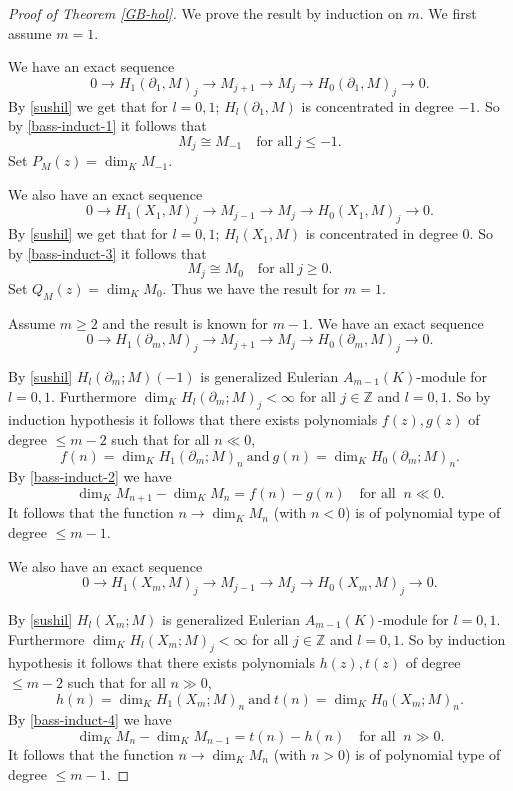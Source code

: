 \documentclass{amsart}
\newcommand{\ZZ}{\mathbb{Z} }
\newcommand{\rt}{\rightarrow}
\theoremstyle{plain}
\theoremstyle{definition}
\theoremstyle{remark}
\begin{document}
\begin{proof}[Proof of Theorem \ref{GB-hol}]
We prove the result by induction on $m$. We first assume $m = 1$.


We have an exact sequence
 \begin{equation}
  \label{bass-induct-1}
  0 \rt H_1(\partial_1, M)_j \rt M_{j+1} \rt M_j \rt H_0(\partial_1, M)_j \rt 0.
 \end{equation}
By \ref{sushil} we get that  for $l = 0,1$; $H_l(\partial_1, M)$ is concentrated in degree $-1$.
So by \ref{bass-induct-1} it follows that 
\[
 M_j \cong M_{-1} \quad \text{for all} \ j \leq -1.
\]
Set $P_M(z) = \dim_K M_{-1}$.

 We  also have an exact sequence
 \begin{equation}
  \label{bass-induct-3}
  0 \rt H_1(X_1, M)_j \rt M_{j-1} \rt M_j \rt H_0(X_1, M)_j \rt 0.
 \end{equation}
By \ref{sushil} we get that for $l = 0, 1$; $H_l(X_1, M)$ is concentrated in degree $0$.
So by \ref{bass-induct-3} it follows that 
\[
 M_j \cong M_{0} \quad \text{for all} \ j \geq 0.
\]
Set $Q_M(z) = \dim_K M_{0}$.
Thus we have the result for $m = 1$.

Assume $m \geq 2$ and the result is known for $m -1$.
We have an exact sequence
 \begin{equation}
  \label{bass-induct-2}
  0 \rt H_1(\partial_m, M)_j \rt M_{j+1} \rt M_j \rt H_0(\partial_m, M)_j \rt 0.
 \end{equation}

By \ref{sushil} $H_l(\partial_m; M)(-1)$ is generalized Eulerian $A_{m-1}(K)$-module for $l = 0, 1$. Furthermore  $ \dim_K H_l(\partial_m; M)_j < \infty$  for all $j \in \ZZ$ and $l = 0, 1$.  So by induction hypothesis it follows that there exists polynomials $f(z), g(z)$ of degree $\leq m-2$ such that  for all $n \ll 0$, 
\[
f(n) = \dim_K H_1(\partial_m; M)_n  \   \text{and} \ g(n) = \dim_K H_0(\partial_m; M)_n. 
\]
By \ref{bass-induct-2} we have 
\[
\dim_K M_{n+1} - \dim_K M_n = f(n) - g(n) \quad \text{for all } \ n \ll 0.
\]
It follows that the function $n \rt \dim_K M_n$ (with $n < 0$) is of polynomial type of degree $\leq m -1$.

We also have an exact sequence
 \begin{equation}
  \label{bass-induct-4}
  0 \rt H_1(X_m, M)_j \rt M_{j-1} \rt M_j \rt H_0(X_m, M)_j \rt 0.
 \end{equation}

By \ref{sushil} $H_l(X_m; M)$ is generalized Eulerian $A_{m-1}(K)$-module for $l = 0,1$.  Furthermore  $ \dim_K H_l(X_m; M)_j < \infty$  for all $j \in \ZZ$ and $l = 0, 1$. 
So by induction hypothesis it follows that there exists polynomials $h(z), t(z)$ of degree $\leq m-2$ such that  for all $n \gg 0$, 
\[
h(n) = \dim_K H_1(X_m; M)_n  \   \text{and} \ t(n) = \dim_K H_0(X_m; M)_n. 
\]
By \ref{bass-induct-4} we have 
\[
\dim_K M_{n} - \dim_K M_{n-1} = t(n) - h(n) \quad \text{for all } \ n \gg 0.
\]
It follows that the function $n \rt \dim_K M_n$ (with $n > 0$) is of polynomial type of degree $\leq m -1$.
\end{proof}
\end{document}

